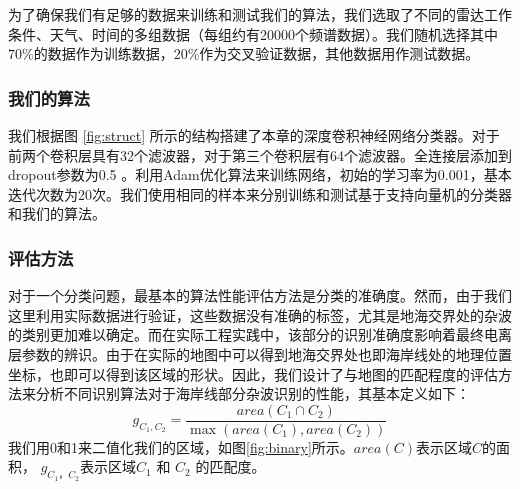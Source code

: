 为了确保我们有足够的数据来训练和测试我们的算法，我们选取了不同的雷达工作条件、天气、时间的多组数据（每组约有20000个频谱数据）。我们随机选择其中$70\%$的数据作为训练数据，$20\%$作为交叉验证数据，其他数据用作测试数据。

\subsubsection{我们的算法}
我们根据图 \ref{fig:struct} 所示的结构搭建了本章的深度卷积神经网络分类器。对于前两个卷积层具有32个滤波器，对于第三个卷积层有64个滤波器。全连接层添加到dropout参数为0.5 。利用Adam优化算法来训练网络，初始的学习率为0.001，基本迭代次数为20次。我们使用相同的样本来分别训练和测试基于支持向量机的分类器和我们的算法。

\subsubsection{评估方法}
对于一个分类问题，最基本的算法性能评估方法是分类的准确度。然而，由于我们这里利用实际数据进行验证，这些数据没有准确的标签，尤其是地海交界处的杂波的类别更加难以确定。而在实际工程实践中，该部分的识别准确度影响着最终电离层参数的辨识。由于在实际的地图中可以得到地海交界处也即海岸线处的地理位置坐标，也即可以得到该区域的形状。因此，我们设计了与地图的匹配程度的评估方法来分析不同识别算法对于海岸线部分杂波识别的性能，其基本定义如下：
\begin{equation}
g_{C_1, C_2} = \frac{area({C_1\cap C_2})}{\max(area({C_1}), area({C_2}))}
\end{equation}
我们用0和1来二值化我们的区域，如图\ref{fig:binary}所示。$area(C)$表示区域$C$的面积， $g_{C_1， C_2}$表示区域$C_1$ 和 $C_2$ 的匹配度。
